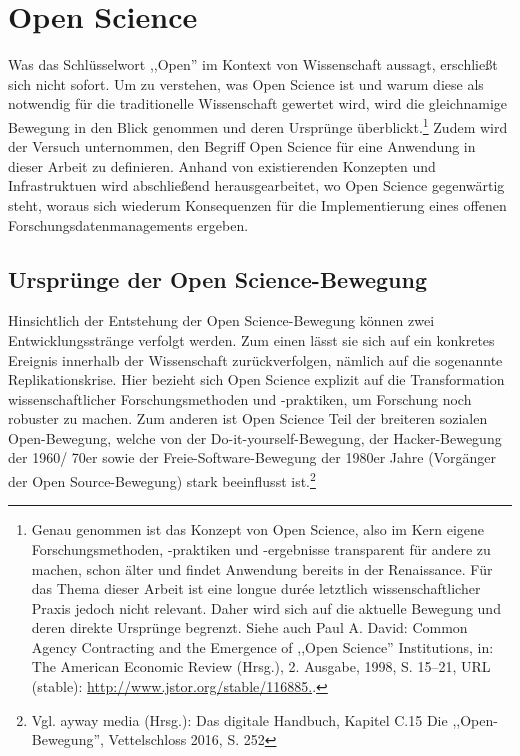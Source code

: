\onehalfspacing

\section{Open Science}

Was das Schlüsselwort ,,Open'' im Kontext von Wissenschaft aussagt, erschließt sich nicht sofort. Um zu verstehen, was Open Science ist und warum diese als notwendig für die traditionelle Wissenschaft gewertet wird, wird die gleichnamige Bewegung in den Blick genommen und deren Ursprünge überblickt.\footnote{Genau genommen ist das Konzept von Open Science, also im Kern eigene Forschungsmethoden,  -praktiken und -ergebnisse transparent für andere zu machen, schon älter und findet Anwendung bereits in der Renaissance. Für das Thema dieser Arbeit ist eine longue durée letztlich wissenschaftlicher Praxis jedoch nicht relevant. Daher wird sich auf die aktuelle Bewegung und deren direkte Ursprünge begrenzt. Siehe auch Paul A. David: Common Agency Contracting and the Emergence of ,,Open Science'' Institutions, in: The American Economic Review (Hrsg.), 2. Ausgabe, 1998, S. 15–21, URL (stable): \url{http://www.jstor.org/stable/116885.}.}\cite{wolf_graphische_2010} Zudem wird der Versuch unternommen, den Begriff Open Science für eine Anwendung in dieser Arbeit zu definieren. Anhand von existierenden Konzepten und Infrastruktuen wird abschließend herausgearbeitet, wo Open Science gegenwärtig steht, woraus sich wiederum Konsequenzen für die Implementierung eines offenen Forschungsdatenmanagements ergeben. 

\subsection{Ursprünge der Open Science-Bewegung}

Hinsichtlich der Entstehung der Open Science-Bewegung können zwei Entwicklungsstränge verfolgt werden. Zum einen lässt sie sich auf ein konkretes Ereignis innerhalb der Wissenschaft zurückverfolgen, nämlich auf die sogenannte Replikationskrise. Hier bezieht sich Open Science explizit auf die Transformation wissenschaftlicher Forschungsmethoden und -praktiken, um Forschung noch robuster zu machen. Zum anderen ist Open Science Teil der breiteren sozialen Open-Bewegung, welche von der Do-it-yourself-Bewegung, der Hacker-Bewegung der 1960/ 70er sowie der Freie-Software-Bewegung der 1980er Jahre
(Vorgänger der Open Source-Bewegung) stark beeinflusst ist.\footnote{Vgl. ayway media (Hrsg.): Das digitale Handbuch,
Kapitel C.15 Die ,,Open-Bewegung'', Vettelschloss 2016, S. 252}


